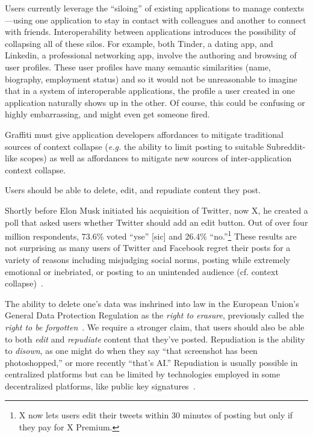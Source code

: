Users currently leverage the ``siloing'' of existing applications to manage contexts---using
one application to stay in contact with colleagues and another to connect with friends.
Interoperability between applications introduces the possibility
of collapsing all of these silos.
For example, both Tinder, a dating app, and Linkedin, a professional networking app, involve the authoring
and browsing of user profiles.
These user profiles have many semantic similarities (name, biography, employment status) and so
it would not be unreasonable to imagine that in a system of interoperable applications,
the profile a user created in one application
naturally shows up in the other.
Of course, this could be confusing or highly embarrassing, and might even get someone fired.

Graffiti must give application developers affordances to mitigate traditional sources
of context collapse (\emph{e.g.} the ability to limit posting to suitable Subreddit-like scopes)
as well as affordances to mitigate new sources of inter-application context collapse.


\begin{requirement}[Forgiving]
\label{requirements:forgiving}
    Users should be able to delete, edit, and repudiate content they post.
\end{requirement}

Shortly before Elon Musk initiated his acquisition of Twitter, now X,
he created a poll that asked users whether Twitter should add an edit button.
Out of over four million respondents, 73.6\% voted ``yse'' [sic] and 26.4\% ``no.''\footnote{
  X now lets users edit their tweets within 30 minutes of posting but only
  if they pay for X Premium.
} These results are not surprising as many users of Twitter and Facebook regret
their posts for a variety of reasons
including misjudging social norms, posting while extremely emotional or inebriated,
or posting to an unintended audience (cf. context collapse)~\cite{regret, regrettwitter}.

The ability to delete one's data was inshrined into law in the European Union's
General Data Protection Regulation as
the \emph{right to erasure}, previously called the \emph{right to be forgotten}~\cite{gdpr}.
We require a stronger claim, that users should also be able to both \emph{edit}
and \emph{repudiate} content that they've posted. Repudiation is the ability to \emph{disown},
as one might do when they say ``that screenshot has been photoshopped,''
or more recently ``that's AI.'' Repudiation is usually possible in centralized platforms
but can be limited by technologies employed in some decentralized platforms,
like public key signatures~\cite{offtherecord}.

